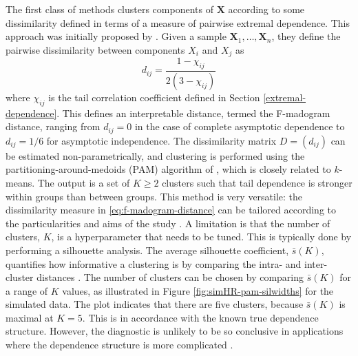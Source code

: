\documentclass[en-GB, a4paper, nobind]{templates/bathreport}
\begin{document}
The first class of methods clusters components of \(\bm{X}\) according to some dissimilarity defined in terms of a measure of pairwise extremal dependence. This approach was initially proposed by \textcite{bernardClusteringMaximaSpatial2013}. Given a sample \(\bm{X}_1,\ldots,\bm{X}_n\), they define the pairwise dissimilarity between components \(X_i\) and \(X_j\) as
\begin{equation}
d_{ij} = \frac{1-\chi_{ij}}{2(3-\chi_{ij})}
\label{eq:f-madogram-distance}
\end{equation}
where \(\chi_{ij}\) is the tail correlation coefficient defined in Section \ref{extremal-dependence}. This defines an interpretable distance, termed the F-madogram distance, ranging from \(d_{ij}=0\) in the case of complete asymptotic dependence to \(d_{ij}=1/6\) for asymptotic independence. The dissimilarity matrix \(D=(d_{ij})\) can be estimated non-parametrically, and clustering is performed using the partitioning-around-medoids (PAM) algorithm of \textcite{kaufmanFindingGroupsData1990}, which is closely related to \(k\)-means. The output is a set of \(K\geq 2\) clusters such that tail dependence is stronger within groups than between groups. This method is very versatile: the dissimilarity measure in \eqref{eq:f-madogram-distance} can be tailored according to the particularities and aims of the study \autocite{badorFutureSummerMegaheatwave2017,brackenSpatialVariabilitySeasonal2015,mornetWindStormRisk2017,saundersRegionalisationApproachRainfall2020,vignottoClusteringBivariateDependencies2021}. A limitation is that the number of clusters, \(K\), is a hyperparameter that needs to be tuned. This is typically done by performing a silhouette analysis. The average silhouette coefficient, \(\bar{s}(K)\), quantifies how informative a clustering is by comparing the intra- and inter-cluster distances \autocite{rousseeuwSilhouettesGraphicalAid1987}. The number of clusters can be chosen by comparing \(\bar{s}(K)\) for a range of \(K\) values, as illustrated in Figure \ref{fig:simHR-pam-silwidths} for the simulated data. The plot indicates that there are five clusters, because \(\bar{s}(K)\) is maximal at \(K=5\). This is in accordance with the known true dependence structure. However, the diagnostic is unlikely to be so conclusive in applications where the dependence structure is more complicated \autocite[see][]{bernardClusteringMaximaSpatial2013}.
\end{document}
